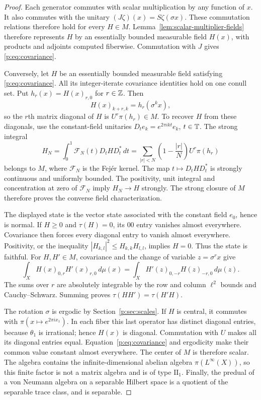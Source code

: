 \begin{proof}
Each generator commutes with scalar multiplication by any function
of $x$. It also commutes with the unitary
$(J\zeta)(x)=S\zeta(\sigma x)$. These commutation relations therefore
hold for every $H\in M$.
Lemma~\ref{lem:scalar-multiplier-fields} therefore represents $H$ by an
essentially bounded measurable field $H(x)$, with products and adjoints
computed fiberwise. Commutation with $J$ gives
\eqref{p:eq:covariance}.

Conversely, let $H$ be an essentially bounded measurable field satisfying
\eqref{p:eq:covariance}.  All its integer-iterate covariance identities
hold on one conull set.  Put $h_r(x)=H(x)_{r,0}$ for $r\in\mathbb Z$.
Then
\[
 H(x)_{k+r,k}=h_r(\sigma^k x),
\]
so the $r$th matrix diagonal of $H$ is $U^r\pi(h_r)\in M$.
To recover $H$ from these diagonals, use the constant-field unitaries
$D_t e_k=e^{2\pi i kt}e_k$, $t\in\mathbb T$.  The strong integral
\[
 H_N=\int_0^1\mathcal F_N(t)D_tHD_t^*\,dt
 =\sum_{|r|<N}\left(1-\frac{|r|}{N}\right)U^r\pi(h_r)
\]
belongs to $M$, where $\mathcal F_N$ is the Fej\'er kernel.  The map $t\mapsto D_tHD_t^*$ is strongly
continuous and uniformly bounded.  The positivity, unit integral and
concentration at zero of $\mathcal F_N$ imply $H_N\to H$ strongly.
The strong closure of $M$ therefore proves the converse field
characterization.

The displayed state is the vector state associated with the constant
field $e_0$, hence is normal. If $H\geq0$ and $\tau(H)=0$, its
$00$ entry vanishes almost everywhere. Covariance then forces every
diagonal entry to vanish almost everywhere. Positivity, or the
inequality $|H_{k,l}|^2\leq H_{k,k}H_{l,l}$, implies $H=0$.
Thus the state is faithful. For $H,H'\in M$, covariance and the
change of variable $z=\sigma^r x$ give
\[
 \int_X H(x)_{0,r}H'(x)_{r,0}\,d\mu(x)
 =\int_X H'(z)_{0,-r}H(z)_{-r,0}\,d\mu(z).
\]
The sums over $r$ are absolutely integrable by the row and column
$\ell^2$ bounds and Cauchy--Schwarz. Summing proves
$\tau(HH')=\tau(H'H)$.

The rotation $\sigma$ is ergodic by Section~\ref{p:sec:scales}.
If $H$ is central, it commutes with
$\pi(x\mapsto e^{2\pi i x_1})$. In each fiber this last operator has
distinct diagonal entries, because $\theta_1$ is irrational; hence
$H(x)$ is diagonal. Commutation with $U$ makes all its diagonal
entries equal. Equation~\eqref{p:eq:covariance} and ergodicity make
their common value constant almost everywhere. The center of $M$
is therefore scalar. The algebra contains the infinite-dimensional
abelian algebra $\pi(L^\infty(X))$, so this finite factor is not a
matrix algebra and is of type $\mathrm{II}_1$. Finally, the predual
of a von Neumann algebra on a separable Hilbert space is a quotient
of the separable trace class, and is separable.
\end{proof}

